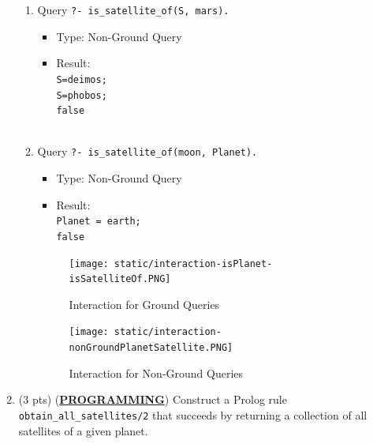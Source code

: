 \documentclass[12pt]{article}
\begin{document}
\begin{spacing}{1.5}
\begin{enumerate}
\begin{enumerate}
		      	\item 
		      	      Query \texttt{?- is\_satellite\_of(S, mars).}
		      	      \begin{itemize}
		      	      	\item Type: Non-Ground Query
		      	      	\item Result: \texttt{\\
		      	      		S=deimos;\\
		      	      		S=phobos;\\
		      	      	false\\}\\
		      	      \end{itemize}

                \item
                    Query \texttt{?- is\_satellite\_of(moon, Planet).}
                    \begin{itemize}
                        \item Type: Non-Ground Query
                        \item Result: \texttt{\\
                            Planet = earth;\\
                            false\\}
                    \end{itemize}

            \begin{figure}[htp]
        		\centering
        		\texttt{[image: static/interaction-isPlanet-isSatelliteOf.PNG]}
        		\caption{Interaction for Ground Queries}
        		\label{fig:figure}
        	\end{figure}

            \begin{figure}[htp]
                \centering
                \texttt{[image: static/interaction-nonGroundPlanetSatellite.PNG]}
                \caption{Interaction for Non-Ground Queries}
                \label{fig:figure}
            \end{figure}
		      	              
		      \end{enumerate}
        \newpage
		\item
		      (3 pts) (\uline{\textbf{PROGRAMMING}}) Construct a Prolog rule \texttt{obtain\_all\_satellites/2}
		      that succeeds by returning a collection of all satellites of a given planet.\\


\end{enumerate}
\end{spacing}
\end{document}
